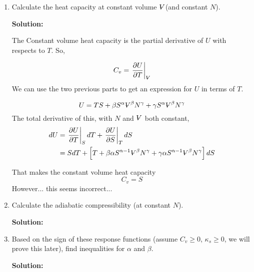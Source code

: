 \documentclass[10pt]{article}
\newenvironment{Solution}
    {\textbf{Solution:}
    
    \vspace{5mm}
    \begin{tcolorbox}
    }
    {
    \end{tcolorbox}
    \vspace{5mm}
    }
\newcommand{\vol}{{\ooalign{\hfil$V$\hfil\cr\kern0.08em--\hfil\cr}}}
\begin{document}
\begin{enumerate}
\begin{enumerate}
\begin{Solution}
    \end{Solution}


    \item Calculate the heat capacity at constant volume $\vol$(and constant $N$).
    
    \begin{Solution}    
    The Constant volume heat capacity is the partial derivative of $U$ with respects to $T$. So,
    
    \begin{equation}
        C_v = \left.\frac{\partial U}{\partial T}\right|_{\scriptsize{\vol}}
    \end{equation}
    We can use the two previous parts to get an expression for $U$ in terms of $T$.
    
    \begin{equation}
        U = T S + \beta S^\alpha \vol^\beta N^\gamma + \gamma S^\alpha \vol^\beta N^\gamma
    \end{equation}
    The total derivative of this, with $N$ and $\vol$ both constant,
    \begin{align}
        dU &= \left.\frac{\partial U}{\partial T}\right|_S dT + \left.\frac{\partial U}{\partial S}\right|_T dS\\
        &= S dT + \left[T + \beta\alpha S^{\alpha-1}\vol^\beta N^\gamma + \gamma\alpha S^{\alpha-1}\vol^\beta N^\gamma\right]dS
    \end{align}
    
    That makes the constant volume heat capacity
    \begin{equation}
    \boxed{
    C_v = S
    }        
    \end{equation}
    However... this seems incorrect...
    \end{Solution}

    \item Calculate the adiabatic compressibility (at constant $N$).
    
    \begin{Solution}    
    
    
    \end{Solution}
    
    \item Based on the sign of these response functions (assume $C_v \geq 0$, $\kappa_s \geq 0$, we will prove this later), find inequalities for $\alpha$ and $\beta$.
    
    \begin{Solution}    
    

\end{Solution}
\end{enumerate}
\end{enumerate}
\end{document}
